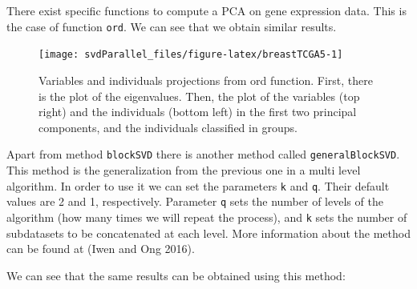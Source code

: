 \documentclass[]{article}
\newenvironment{Shaded}{\begin{snugshade}}{\end{snugshade}}
\newcommand{\KeywordTok}[1]{\textcolor[rgb]{0.13,0.29,0.53}{\textbf{#1}}}
\newcommand{\DataTypeTok}[1]{\textcolor[rgb]{0.13,0.29,0.53}{#1}}
\newcommand{\DecValTok}[1]{\textcolor[rgb]{0.00,0.00,0.81}{#1}}
\newcommand{\StringTok}[1]{\textcolor[rgb]{0.31,0.60,0.02}{#1}}
\newcommand{\OperatorTok}[1]{\textcolor[rgb]{0.81,0.36,0.00}{\textbf{#1}}}
\newcommand{\NormalTok}[1]{#1}
\begin{document}
There exist specific functions to compute a PCA on gene expression data.
This is the case of function \texttt{ord}. We can see that we obtain
similar results.

\begin{Shaded}
\end{Shaded}

\begin{figure}

{\centering \texttt{[image: svdParallel\_files/figure-latex/breastTCGA5-1]} 

}

\caption{Variables and individuals projections from ord function. First, there is the plot of the eigenvalues. Then, the plot of the variables (top right) and the individuals (bottom left) in the first two principal components, and the individuals classified in groups.}\label{fig:breastTCGA5}
\end{figure}

Apart from method \texttt{blockSVD} there is another method called
\texttt{generalBlockSVD}. This method is the generalization from the
previous one in a multi level algorithm. In order to use it we can set
the parameters \texttt{k} and \texttt{q}. Their default values are 2 and
1, respectively. Parameter \texttt{q} sets the number of levels of the
algorithm (how many times we will repeat the process), and \texttt{k}
sets the number of subdatasets to be concatenated at each level. More
information about the method can be found at (Iwen and Ong 2016).

We can see that the same results can be obtained using this method:
\end{document}
